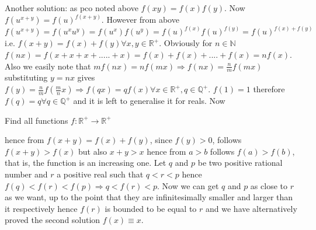 \begin{solution}
	Another solution: as pco noted above $f(xy)=f(x)f(y)$.
Now $f(u^{x+y})=f(u)^{f(x+y)}$.
However from above $f(u^{x+y})=f(u^xu^y)=f(u^x)f(u^y)=f(u)^{f(x)}f(u)^{f(y)}=f(u)^{f(x)+f(y)}$ 
i.e. $f(x+y)=f(x)+f(y) \forall x,y \in \mathbb{R}^+$.
Obviously for $n \in \mathbb{N}$ $f(nx)=f(x+x+x+.....+x)=f(x)+f(x)+....+f(x)=nf(x)$.
Also we easily note that $mf(nx)=nf(mx) \Rightarrow f(nx)=\frac{n}{m} f(mx)$ substituting $y=nx$ gives $f(y)=\frac{n}{m} f(\frac{m}{n} x) \Rightarrow f(qx)=qf(x) \forall x \in \mathbb{R}^+, q \in \mathbb{Q}^+$.
$f(1)=1$ therefore $f(q)=q \forall q \in \mathbb{Q}^+$ and it is left to generalise it for reals.
Now \begin{tcolorbox}Find all functions $f : \mathbb{R}^+ \rightarrow \mathbb{R}^+$\end{tcolorbox}
hence from $f(x+y)=f(x)+f(y)$, since $f(y)>0$, follows $f(x+y)>f(x)$ but also $x+y>x$ hence from $a>b$ follows $f(a)>f(b)$, that is, the function is an increasing one.
Let $q$ and $p$ be two positive rational number and $r$ a positive real such that $q<r<p$ hence $f(q)<f(r)<f(p) \Rightarrow q<f(r)<p$. Now we can get $q$ and $p$ as close to $r$ as we want, up to the point that they are infinitesimally smaller and larger than it respectively hence $f(r)$ is bounded to be equal to $r$ and we have alternatively proved the second solution $f(x)\equiv x$.
\end{solution}






